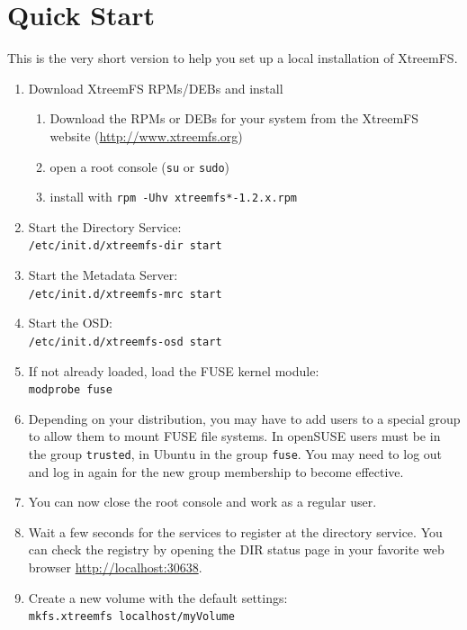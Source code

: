 \documentclass[a4paper,10pt]{book}
\begin{document}
\chapter{Quick Start}

This is the very short version to help you set up a local installation of XtreemFS.

\begin{enumerate}
 \item Download XtreemFS RPMs/DEBs and install
	\begin{enumerate}
		\item Download the RPMs or DEBs for your system from the XtreemFS website (\href{http://www.xtreemfs.org}{http://www.xtreemfs.org})
		\item open a root console (\texttt{su} or \texttt{sudo})
		\item install with \texttt{rpm -Uhv xtreemfs*-1.2.x.rpm}
	\end{enumerate}
\item Start the Directory Service:\\
	\texttt{/etc/init.d/xtreemfs-dir start}
\item Start the Metadata Server:\\
	\texttt{/etc/init.d/xtreemfs-mrc start}
\item Start the OSD:\\
	\texttt{/etc/init.d/xtreemfs-osd start}

\item If not already loaded, load the FUSE kernel module:\\
	\texttt{modprobe fuse}

\item Depending on your distribution, you may have to add users to a special group to allow them to mount FUSE file systems. In openSUSE users must be in the group \texttt{trusted}, in Ubuntu in the group \texttt{fuse}. You may need to log out and log in again for the new group membership to become effective.

\item You can now close the root console and work as a regular user.

\item Wait a few seconds for the services to register at the directory service. You can check the registry by opening the DIR status page in your favorite web browser \href{http://localhost:30638}{http://localhost:30638}.

\item Create a new volume with the default settings:\\
	\texttt{mkfs.xtreemfs localhost/myVolume}


\end{enumerate}
\end{document}
